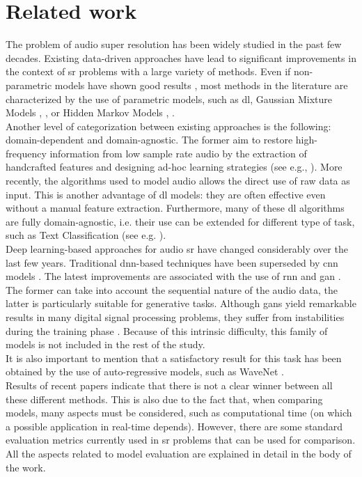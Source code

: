 \section{Related work}
The problem of audio super resolution has been widely studied in the past few decades. Existing data-driven approaches have lead to significant improvements in the context of \gls{sr} problems with a large variety of methods. Even if non-parametric models have shown good results \cite{freeman2002example}, most methods in the literature are characterized by the use of parametric models, such as \gls{dl}, Gaussian Mixture Models \cite{cheng1994statistical}, \cite{park2000narrowband}, \cite{pulakka2011speech} or Hidden Markov Models \cite{jax2003artificial}, \cite{song2009study}. \\
Another level of categorization between existing approaches is the following: domain-dependent and domain-agnostic. The former aim to restore high-frequency information from low sample rate audio by the extraction of handcrafted features and designing ad-hoc learning strategies (see e.g., \cite{pulakka2011speech}). More recently, the algorithms used to model audio allows the direct use of raw data as input. This is another advantage of \gls{dl} models: they are often effective even without a manual feature extraction. Furthermore, many of these \gls{dl} algorithms are fully domain-agnostic, i.e. their use can be extended for different type of task, such as Text Classification (see e.g. \cite{birnbaum2019temporal}). \\
Deep learning-based approaches for audio \gls{sr} have changed considerably over the last few years. Traditional \gls{dnn}-based techniques \cite{li2015dnn} have been superseded by \gls{cnn} models \cite{kuleshov2017audio}. The latest improvements are associated with the use of \gls{rnn} \cite{birnbaum2019temporal} and \gls{gan} \cite{eskimez2019speech}. The former can take into account the sequential nature of the audio data, the latter is particularly suitable for generative tasks. Although \gls{gan}s yield remarkable results in many digital signal processing problems, they suffer from instabilities during the training phase \cite{mescheder2018training}. Because of this intrinsic difficulty, this family of models is not included in the rest of the study. \\ 
It is also important to mention that a satisfactory result for this task has been obtained by the use of auto-regressive models, such as WaveNet \cite{wang2018speech}. \\
Results of recent papers indicate that there is not a clear winner between all these different methods. This is also due to the fact that, when comparing models, many aspects must be considered, such as computational time (on which a possible application in real-time depends). However, there are some standard evaluation metrics currently used in \gls{sr} problems that can be used for comparison. All the aspects related to model evaluation are explained in detail in the body of the work. 
\newpage 
